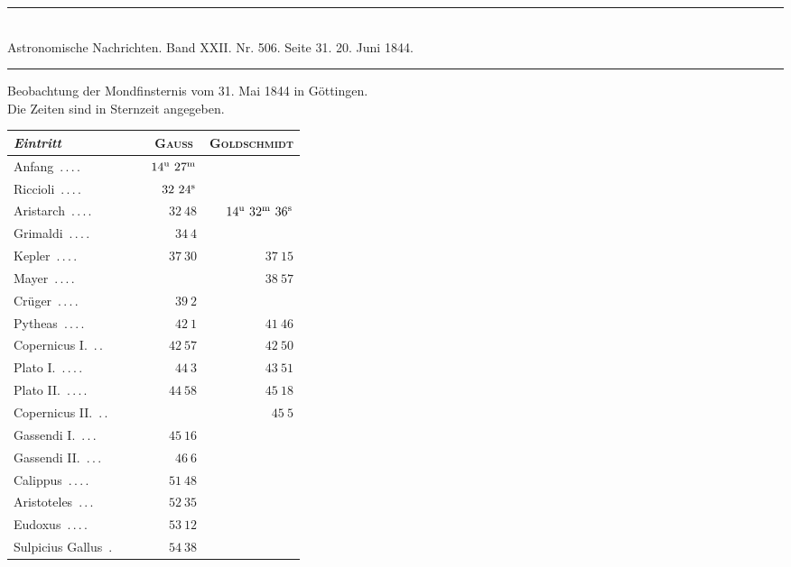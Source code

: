 \clearpage
{}
\begin{center}
\rule{0.55\linewidth}{0.4pt}\\[2pt]
Astronomische Nachrichten. Band XXII. Nr. 506. Seite 31. 20. Juni 1844.\\[2pt]
\rule{0.55\linewidth}{0.4pt}
\end{center}
\begin{center}
Beobachtung der Mondfinsternis vom 31. Mai 1844 in Göttingen.\\
Die Zeiten sind in Sternzeit angegeben.
\end{center}

\begin{center}\begingroup\fontsize{10}{12}\selectfont\setlength{\tabcolsep}{5pt}
\begin{tabular}{@{}p{0.47\linewidth}|r|r@{}}
\emph{Eintritt} & \multicolumn{1}{c|}{\textsc{Gauss}} & \multicolumn{1}{c}{\textsc{Goldschmidt}}\\\hline
Anfang\ \mbox{.\,.\,.\,.} & $14^{\rm u}\ 27^{\rm m}$ & \\
Riccioli\ \mbox{.\,.\,.\,.} & $32\ 24^{\rm s}$ & \\
Aristarch\ \mbox{.\,.\,.\,.} & $32\ 48$ & $14^{\rm u}\ 32^{\rm m}\ 36^{\rm s}$\\
Grimaldi\ \mbox{.\,.\,.\,.} & $34\ 4$ & \\
Kepler\ \mbox{.\,.\,.\,.} & $37\ 30$ & $37\ 15$\\
Mayer\ \mbox{.\,.\,.\,.} &  & $38\ 57$\\
Crüger\ \mbox{.\,.\,.\,.} & $39\ 2$ & \\
Pytheas\ \mbox{.\,.\,.\,.} & $42\ 1$ & $41\ 46$\\
Copernicus I.\ \mbox{.\,.} & $42\ 57$ & $42\ 50$\\
Plato I.\ \mbox{.\,.\,.\,.} & $44\ 3$ & $43\ 51$\\
Plato II.\ \mbox{.\,.\,.\,.} & $44\ 58$ & $45\ 18$\\
Copernicus II.\ \mbox{.\,.} &  & $45\ 5$\\
Gassendi I.\ \mbox{.\,.\,.} & $45\ 16$ & \\
Gassendi II.\ \mbox{.\,.\,.} & $46\ 6$ & \\
Calippus\ \mbox{.\,.\,.\,.} & $51\ 48$ & \\
Aristoteles\ \mbox{.\,.\,.} & $52\ 35$ & \\
Eudoxus\ \mbox{.\,.\,.\,.} & $53\ 12$ & \\
Sulpicius Gallus\ \mbox{.} & $54\ 38$ & \\

\end{tabular}
\end{center}
